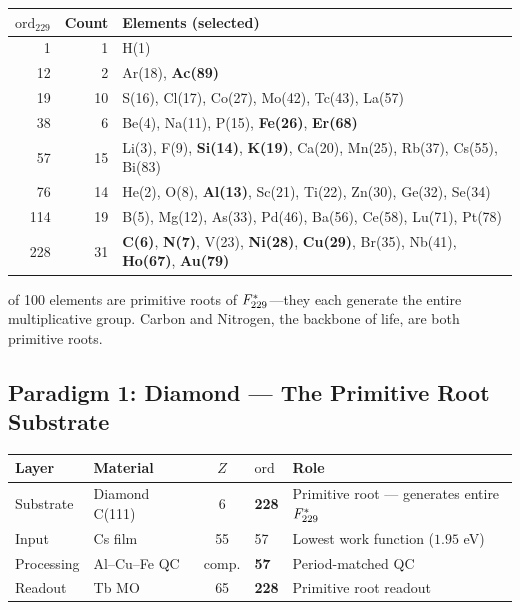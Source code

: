 \begin{center}
{\small
\begin{tabular}{@{}rrl@{}}
\toprule
$\mathrm{ord}_{229}$ & \textbf{Count} & \textbf{Elements (selected)} \\
\midrule
1 & 1 & H(1) \\
12 & 2 & Ar(18), \textbf{Ac(89)} \\
19 & 10 & S(16), Cl(17), Co(27), Mo(42), Tc(43), La(57) \\
38 & 6 & Be(4), Na(11), P(15), \textbf{Fe(26)}, \textbf{Er(68)} \\
57 & 15 & Li(3), F(9), \textbf{Si(14)}, \textbf{K(19)}, Ca(20), Mn(25), Rb(37), Cs(55), Bi(83) \\
76 & 14 & He(2), O(8), \textbf{Al(13)}, Sc(21), Ti(22), Zn(30), Ge(32), Se(34) \\
114 & 19 & B(5), Mg(12), As(33), Pd(46), Ba(56), Ce(58), Lu(71), Pt(78) \\
228 & 31 & \textbf{C(6)}, \textbf{N(7)}, V(23), \textbf{Ni(28)}, \textbf{Cu(29)}, Br(35), Nb(41), \textbf{Ho(67)}, \textbf{Au(79)} \\
\bottomrule
\end{tabular}
}
\end{center}

 of 100 elements are primitive roots of $F_{229}^*$---they each generate the entire multiplicative group. Carbon and Nitrogen, the backbone of life, are both primitive roots.

\subsection{Paradigm 1: Diamond --- The Primitive Root Substrate}

\begin{center}
\begin{tabular}{@{}llcll@{}}
\toprule
\textbf{Layer} & \textbf{Material} & $Z$ & $\mathrm{ord}$ & \textbf{Role} \\
\midrule
Substrate & Diamond C(111) & 6 & \textbf{228} & Primitive root --- generates entire $F_{229}^*$ \\
Input & Cs film & 55 & 57 & Lowest work function ($1.95$ eV) \\
Processing & Al--Cu--Fe QC & comp. & \textbf{57} & Period-matched QC \\
Readout & Tb MO & 65 & \textbf{228} & Primitive root readout \\
\bottomrule
\end{tabular}
\end{center}

